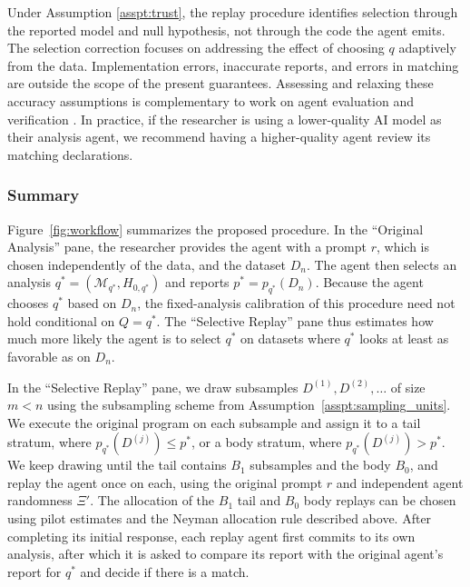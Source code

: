 \documentclass[10pt]{article}
\begin{document}
Under Assumption \ref{asspt:trust}, the replay procedure identifies selection through the reported model and null hypothesis, not through the code the agent emits. The selection correction focuses on addressing the effect of choosing $q$ adaptively from the data. Implementation errors, inaccurate reports, and errors in matching are outside the scope of the present guarantees. Assessing and relaxing these accuracy assumptions is complementary to work on agent evaluation and verification \citep[see, e.g.][]{gu2024blade, deng2025swe, majumder2025discoverybench, huang2025automated, candes2025probably, lee2026fuse}. In practice, if the researcher is using a lower-quality AI model as their analysis agent, we recommend having a higher-quality agent review its matching declarations.

\subsubsection{Summary} \label{sec:estimator_summary}

Figure~\ref{fig:workflow} summarizes the proposed procedure. In the ``Original Analysis'' pane, the researcher provides the agent with a prompt $r$, which is chosen independently of the data, and the dataset $D_n$. The agent then selects an analysis $q^*=(\mathcal M_{q^*},H_{0,q^*})$ and reports $p^*=p_{q^*}(D_n)$. Because the agent chooses $q^*$ based on $D_n$, the fixed-analysis calibration of this procedure need not hold conditional on $Q=q^*$. The ``Selective Replay'' pane thus estimates how much more likely the agent is to select $q^*$ on datasets where $q^*$ looks at least as favorable as on $D_n$.

In the ``Selective Replay'' pane, we draw subsamples $D^{(1)},D^{(2)},\ldots$ of size $m<n$ using the subsampling scheme from Assumption~\ref{asspt:sampling_units}. We execute the original program on each subsample and assign it to a tail stratum, where $p_{q^*}(D^{(j)})\leq p^*$, or a body stratum, where $p_{q^*}(D^{(j)})>p^*$. We keep drawing until the tail contains $B_1$ subsamples and the body $B_0$, and replay the agent once on each, using the original prompt $r$ and independent agent randomness $\Xi'$. The allocation of the $B_1$ tail and $B_0$ body replays can be chosen using pilot estimates and the Neyman allocation rule described above. After completing its initial response, each replay agent first commits to its own analysis, after which it is asked to compare its report with the original agent's report for $q^*$ and decide if there is a match.
\end{document}
